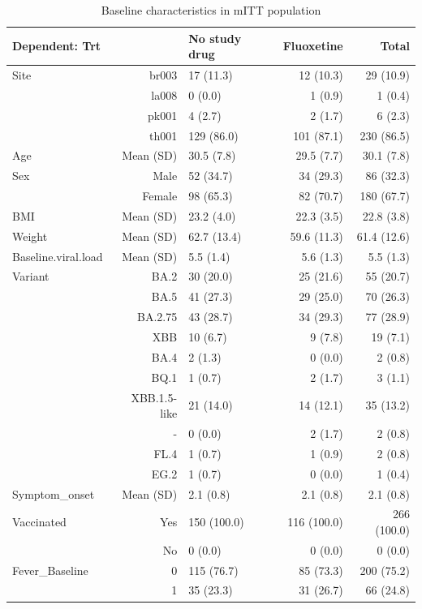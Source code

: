 \documentclass[
  letterpaper,
  DIV=11,
  numbers=noendperiod]{scrartcl}
\begin{document}
\begin{table}

\caption{Baseline characteristics in mITT population}
\centering
\begin{tabular}[t]{lrlrr}
\toprule
Dependent: Trt &   & No study drug & Fluoxetine & Total\\
\midrule
Site & br003 & 17 (11.3) & 12 (10.3) & 29 (10.9)\\
 & la008 & 0 (0.0) & 1 (0.9) & 1 (0.4)\\
 & pk001 & 4 (2.7) & 2 (1.7) & 6 (2.3)\\
 & th001 & 129 (86.0) & 101 (87.1) & 230 (86.5)\\
Age & Mean (SD) & 30.5 (7.8) & 29.5 (7.7) & 30.1 (7.8)\\
\addlinespace
Sex & Male & 52 (34.7) & 34 (29.3) & 86 (32.3)\\
 & Female & 98 (65.3) & 82 (70.7) & 180 (67.7)\\
BMI & Mean (SD) & 23.2 (4.0) & 22.3 (3.5) & 22.8 (3.8)\\
Weight & Mean (SD) & 62.7 (13.4) & 59.6 (11.3) & 61.4 (12.6)\\
Baseline.viral.load & Mean (SD) & 5.5 (1.4) & 5.6 (1.3) & 5.5 (1.3)\\
\addlinespace
Variant & BA.2 & 30 (20.0) & 25 (21.6) & 55 (20.7)\\
 & BA.5 & 41 (27.3) & 29 (25.0) & 70 (26.3)\\
 & BA.2.75 & 43 (28.7) & 34 (29.3) & 77 (28.9)\\
 & XBB & 10 (6.7) & 9 (7.8) & 19 (7.1)\\
 & BA.4 & 2 (1.3) & 0 (0.0) & 2 (0.8)\\
\addlinespace
 & BQ.1 & 1 (0.7) & 2 (1.7) & 3 (1.1)\\
 & XBB.1.5-like & 21 (14.0) & 14 (12.1) & 35 (13.2)\\
 & - & 0 (0.0) & 2 (1.7) & 2 (0.8)\\
 & FL.4 & 1 (0.7) & 1 (0.9) & 2 (0.8)\\
 & EG.2 & 1 (0.7) & 0 (0.0) & 1 (0.4)\\
\addlinespace
Symptom\_onset & Mean (SD) & 2.1 (0.8) & 2.1 (0.8) & 2.1 (0.8)\\
Vaccinated & Yes & 150 (100.0) & 116 (100.0) & 266 (100.0)\\
 & No & 0 (0.0) & 0 (0.0) & 0 (0.0)\\
Fever\_Baseline & 0 & 115 (76.7) & 85 (73.3) & 200 (75.2)\\
 & 1 & 35 (23.3) & 31 (26.7) & 66 (24.8)\\
\bottomrule
\end{tabular}
\end{table}
\end{document}
